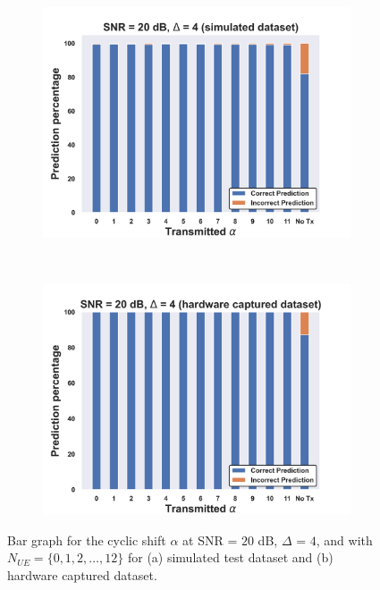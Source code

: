 \documentclass[journal]{IEEEtran}
\begin{document}
\begin{figure}[ht!]
    \captionsetup{justification=justified}
     \centering
     \begin{subfigure}[b]{0.48\textwidth}
         \centering
         \includegraphics[width=\textwidth]{Figures/Bar_alpha_SNR_SNR_20_dB_Max_off_4_train_sim_test_sim.png}
         \caption{}
         \label{fig: bar_alpha_SNR_snr_20_off_4_sim}
     \end{subfigure}
     \\
     \begin{subfigure}[b]{0.48\textwidth}
         \centering
         \includegraphics[width=\textwidth]{Figures/Bar_alpha_SNR_SNR_20_dB_Max_off_4_train_sim_test_hw.png}
         \caption{}
         \label{fig: bar_alpha_SNR_snr_20_off_4_hw}
     \end{subfigure}
        \caption{Bar graph for the cyclic shift $\alpha$ at SNR = $20$ dB, $\Delta$ = $4$, and with $N_{UE} = \{0, 1, 2, \dots, 12\}$ for (a) simulated test dataset and (b) hardware captured dataset.}
        \label{fig: bar_alpha_SNR_snr_20_off_4}
\end{figure}
\end{document}
